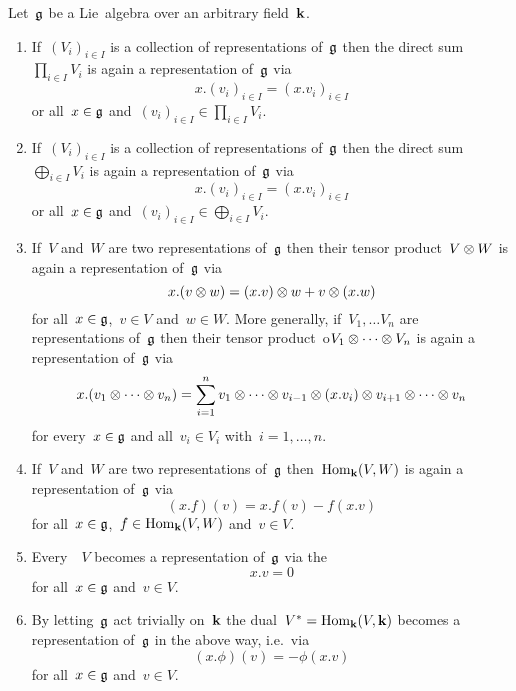 \begin{proposition}
  \label{new representations from old ones}
  Let~$\mathfrak{g}$ be a Lie~algebra over an arbitrary field~$\kf$.
  \begin{enumerate}
    \item
      If~$(V_i)_{i \in I}$ is a collection of representations of~$\mathfrak{g}$ then the direct sum~$\prod_{i \in I} V_i$ is again a representation of~$\mathfrak{g}$ via
      \[
        x.(v_i)_{i \in I}
        =
        ( x.v_i )_{i \in I}
      \]
      or all~$x \in \mathfrak{g}$ and~$(v_i)_{i \in I} \in \prod_{i \in I} V_i$.
    \item
      If~$(V_i)_{i \in I}$ is a collection of representations of~$\mathfrak{g}$ then the direct sum~$\bigoplus_{i \in I} V_i$ is again a representation of~$\mathfrak{g}$ via
      \[
        x.(v_i)_{i \in I}
        =
        ( x.v_i )_{i \in I}
      \]
      or all~$x \in \mathfrak{g}$ and~$(v_i)_{i \in I} \in \bigoplus_{i \in I} V_i$.
    \item
      If~$V$ and~$W$ are two representations of~$\mathfrak{g}$ then their tensor product~$V \otimes W$ is again a representation of~$\mathfrak{g}$ via
      \[
        x.(v \otimes w)
        =
        (x.v) \otimes w + v \otimes (x.w)
      \]
      for all~$x \in \mathfrak{g}$,~$v \in V$ and~$w \in W$.
      More generally, if~$V_1, \dotsc V_n$ are representations of~$\mathfrak{g}$ then their tensor product~o$V_1 \otimes \dotsb \otimes V_n$ is again a representation of~$\mathfrak{g}$ via
      \[
        x.(v_1 \otimes \dotsb \otimes v_n)
        = \sum_{i=1}^n
                  v_1
          \otimes \dotsb
          \otimes v_{i-1}
          \otimes (x.v_i)
          \otimes v_{i+1}
          \otimes \dotsb
          \otimes v_n
      \]
      for every~$x \in \mathfrak{g}$ and all~$v_i \in V_i$ with~$i = 1, \dotsc, n$.
    \item
      If~$V$ and~$W$ are two representations of~$\mathfrak{g}$ then~$\operatorname{Hom}_{\mathbf{k}}(V,W)$ is again a representation of~$\mathfrak{g}$ via
      \[
        (x.f)(v)
        =
        x.f(v) - f(x.v)
      \]
      for all~$x \in \mathfrak{g}$,~$f \in \operatorname{Hom}_{\mathbf{k}}(V,W)$ and~$v \in V$.
    \item
      Every~{\vectorspace{$\kf$}}~$V$ becomes a representation of~$\mathfrak{g}$ via the 
      \[
        x.v
        =
        0
      \]
      for all~$x \in \mathfrak{g}$ and~$v \in V$.
    \item
      By letting~$\mathfrak{g}$ act trivially on~$\kf$ the dual~$V^* = \operatorname{Hom}_{\mathbf{k}}(V, \mathbf{k})$ becomes a representation of~$\mathfrak{g}$ in the above way, i.e.\ via
      \[
        (x.\phi)(v)
        =
        -\phi(x.v)
      \]
      for all~$x \in \mathfrak{g}$ and~$v \in V$.
  \end{enumerate}
\end{proposition}


